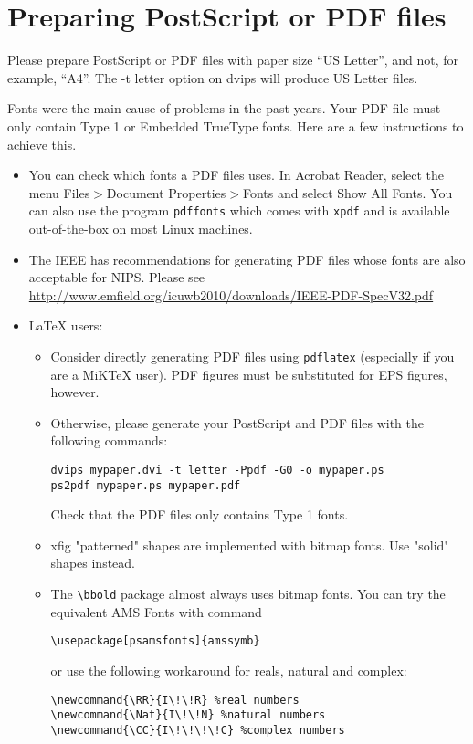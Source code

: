\documentclass{article} %
\begin{document}
\section{Preparing PostScript or PDF files}

Please prepare PostScript or PDF files with paper size ``US Letter'', and
not, for example, ``A4''. The -t
letter option on dvips will produce US Letter files.

Fonts were the main cause of problems in the past years. Your PDF file must
only contain Type 1 or Embedded TrueType fonts. Here are a few instructions
to achieve this.

\begin{itemize}

\item You can check which fonts a PDF files uses.  In Acrobat Reader,
select the menu Files$>$Document Properties$>$Fonts and select Show All Fonts. You can
also use the program \verb+pdffonts+ which comes with \verb+xpdf+ and is
available out-of-the-box on most Linux machines.

\item The IEEE has recommendations for generating PDF files whose fonts
are also acceptable for NIPS. Please see
\url{http://www.emfield.org/icuwb2010/downloads/IEEE-PDF-SpecV32.pdf}

\item LaTeX users:

\begin{itemize}

\item Consider directly generating PDF files using \verb+pdflatex+
(especially if you are a MiKTeX user).
PDF figures must be substituted for EPS figures, however.

\item Otherwise, please generate your PostScript and PDF files with the following commands:
\begin{verbatim}
dvips mypaper.dvi -t letter -Ppdf -G0 -o mypaper.ps
ps2pdf mypaper.ps mypaper.pdf
\end{verbatim}

Check that the PDF files only contains Type 1 fonts.

\item xfig "patterned" shapes are implemented with
bitmap fonts.  Use "solid" shapes instead.
\item The \verb+\bbold+ package almost always uses bitmap
fonts.  You can try the equivalent AMS Fonts with command
\begin{verbatim}
\usepackage[psamsfonts]{amssymb}
\end{verbatim}
 or use the following workaround for reals, natural and complex:
\begin{verbatim}
\newcommand{\RR}{I\!\!R} %real numbers
\newcommand{\Nat}{I\!\!N} %natural numbers
\newcommand{\CC}{I\!\!\!\!C} %complex numbers
\end{verbatim}


\end{itemize}
\end{itemize}
\end{document}
